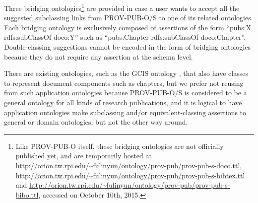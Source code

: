 Three bridging 
ontologies\footnote{Like PROV-PUB-O itself, these bridging ontologies are not officially published yet, and are temporarily hosted at \url{http://orion.tw.rpi.edu/~fulinyun/ontology/prov-pub/prov-pub-s-doco.ttl}, \url{http://orion.tw.rpi.edu/~fulinyun/ontology/prov-pub/prov-pub-s-bibtex.ttl} and 
\url{http://orion.tw.rpi.edu/~fulinyun/ontology/prov-pub/prov-pub-s-bibo.ttl}, accessed on October 10th, 2015.} are provided in case a user wants to accept all the suggested subclassing links from
PROV-PUB-O/S to one of its related ontologies. Each bridging ontology is exclusively composed of assertions of the form ``pubs:X rdfs:subClassOf doco:Y'' 
such as ``pubs:Chapter rdfs:subClassOf doco:Chapter''. Double-classing suggestions cannot be encoded in the form of bridging ontologies because they do 
not require any assertion at the schema level.

There are existing ontologies, such as the GCIS ontology \cite{ma2014ontology}, that also have classes to represent document components such as chapters, but we prefer not reusing from such application ontologies because PROV-PUB-O/S is considered to be a general ontology for all kinds of research publications, and it is logical to have application ontologies make subclassing and/or equivalent-classing assertions to general or domain ontologies, but not the other way around.

